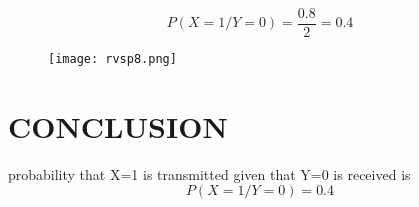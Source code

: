 \documentclass[journal,12pt,twocolumn]{IEEEtran}
\begin{document}
\begin{equation}
    P(X=1/Y=0)=\frac{0.8}{2}=0.4
\end{equation}

\begin{figure}
    \centering
    \texttt{[image: rvsp8.png]}
\end{figure}

\section{\textbf{CONCLUSION}}
probability that X=1 is transmitted given that Y=0 is received is
\begin{equation}
    P(X=1/Y=0)=0.4
\end{equation}
\end{document}
